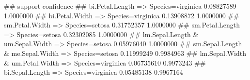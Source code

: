\begin{Schunk}
% --begin: "casestudy-assoc-viewrules"
\begin{Soutput}
##                                                         support confidence
## bi.Petal.Length => Species=virginica                 0.08827589  1.0000000
## bi.Petal.Width => Species=virginica                  0.13908872  1.0000000
## sm.Petal.Width => Species=setosa                     0.31752357  1.0000000
## sm.Petal.Length => Species=setosa                    0.32302085  1.0000000
## lm.Sepal.Length & um.Sepal.Width => Species=setosa   0.05976040  1.0000000
## sm.Sepal.Length & me.Sepal.Width => Species=setosa   0.11999249  0.9984963
## lm.Sepal.Width & um.Petal.Width => Species=virginica 0.06735610  0.9973243
## bi.Sepal.Length => Species=virginica                 0.05485138  0.9967164
\end{Soutput}
%
% --end: "casestudy-assoc-viewrules"
\end{Schunk}
